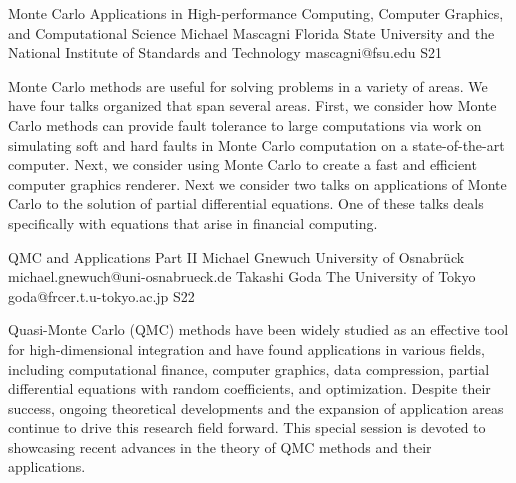 

\clearpage

\begin{session}
 {Monte Carlo Applications in High-performance Computing, Computer Graphics, and Computational Science}%
 {Michael Mascagni}%
 {Florida State University and the National Institute of Standards and Technology}%
 {mascagni@fsu.edu}%
{}{}{}
 {S21}%
{}

 Monte Carlo methods are useful for solving problems in a variety of areas.  We have four talks organized that span several areas.  First,  we consider how Monte Carlo methods can provide fault tolerance to large computations via work on simulating soft and hard faults in Monte Carlo computation on a state-of-the-art computer.  Next, we consider using Monte Carlo to create a fast and efficient computer graphics renderer. Next we consider two talks on applications of Monte Carlo to the solution of partial differential equations.  One of these talks deals specifically with equations that arise in financial computing.
\end{session}



\clearpage

\begin{session}
 {QMC and Applications Part II}%
 {Michael Gnewuch}%
 {University of Osnabr\"uck}%
 {michael.gnewuch@uni-osnabrueck.de}%
 {Takashi Goda}%
 {The University of Tokyo}%
 {goda@frcer.t.u-tokyo.ac.jp}%
 {S22}%
 {}%

 Quasi-Monte Carlo (QMC) methods have been widely studied as an effective tool for high-dimensional integration and have found applications in various fields, including computational finance, computer graphics, data compression, partial differential equations with random coefficients, and %
 optimization.
 Despite their success, ongoing theoretical developments and the expansion of application areas continue to drive this research field forward. This special session is devoted to showcasing recent advances in the theory of QMC methods and their applications.
\end{session}

